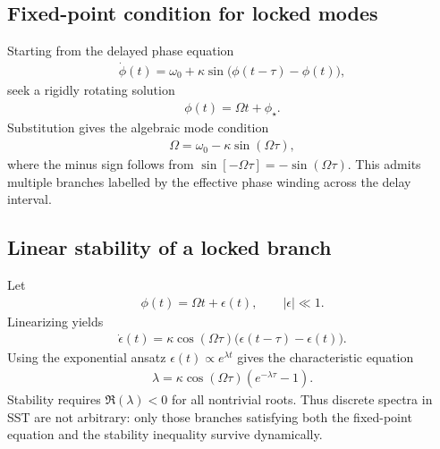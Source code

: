 \documentclass[11pt]{article}
\theoremstyle{definition}
\theoremstyle{plain}
\theoremstyle{remark}
\begin{document}
        \subsection{Fixed-point condition for locked modes}
            Starting from the delayed phase equation
            \begin{align}
                \dot{\phi}(t) = \omega_0 + \kappa \sin\big(\phi(t-\tau)-\phi(t)\big),
            \end{align}
            seek a rigidly rotating solution
            \begin{align}
                \phi(t)=\Omega t + \phi_\star.
            \end{align}
            Substitution gives the algebraic mode condition
            \begin{align}
                \Omega = \omega_0 - \kappa \sin(\Omega\tau),
            \end{align}
            where the minus sign follows from $\sin[-\Omega\tau]=-\sin(\Omega\tau)$. This admits multiple branches labelled by the effective phase winding across the delay interval.

        \subsection{Linear stability of a locked branch}
            Let
            \begin{align}
                \phi(t) = \Omega t + \epsilon(t),
                \qquad |\epsilon|\ll 1.
            \end{align}
            Linearizing yields
            \begin{align}
                \dot{\epsilon}(t)
                =
                \kappa \cos(\Omega\tau)
                \big(\epsilon(t-\tau)-\epsilon(t)\big).
            \end{align}
            Using the exponential ansatz $\epsilon(t)\propto e^{\lambda t}$ gives the characteristic equation
            \begin{align}
                \lambda
                =
                \kappa \cos(\Omega\tau)
                \left(e^{-\lambda\tau}-1\right).
            \end{align}
            Stability requires $\Re(\lambda)<0$ for all nontrivial roots. Thus discrete spectra in SST are not arbitrary: only those branches satisfying both the fixed-point equation and the stability inequality survive dynamically.
\end{document}
